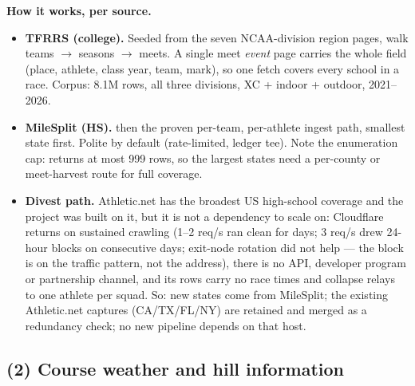 \noindent\textbf{How it works, per source.}
\begin{itemize}
  \item \textbf{TFRRS (college).} Seeded from the seven NCAA-division region
    pages, walk teams $\to$ seasons $\to$ meets. A single meet \emph{event} page
    carries the whole field (place, athlete, class year, team, mark), so one
    fetch covers every school in a race. Corpus: 8.1M rows, all three divisions,
    XC + indoor + outdoor, 2021--2026.
  \item \textbf{MileSplit (HS).}  then the proven
    per-team, per-athlete ingest path, smallest state first. Polite by default
    (rate-limited, ledger tee). Note the enumeration cap: 
    returns at most 999 rows, so the largest states need a per-county or
    meet-harvest route for full coverage.
  \item \textbf{Divest path.} Athletic.net has the broadest US high-school
    coverage and the project was built on it, but it is not a dependency to
    scale on: Cloudflare returns  on sustained
    crawling (1--2 req/s ran clean for days; 3 req/s drew 24-hour blocks on
    consecutive days; exit-node rotation did not help --- the block is on the
    traffic pattern, not the address), there is no API, developer program or
    partnership channel, and its rows carry no race times and collapse relays
    to one athlete per squad. So: new states come from MileSplit; the existing
    Athletic.net captures (CA/TX/FL/NY) are retained and merged as a redundancy
    check; no new pipeline depends on that host.
\end{itemize}

\subsection{(2) Course weather and hill information}

